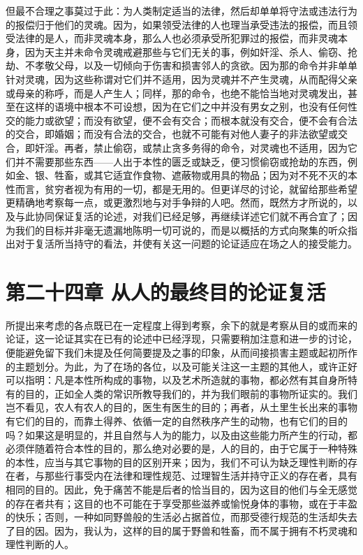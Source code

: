 但最不合理之事莫过于此：为人类制定适当的法律，然后却单单将守法或违法行为的报偿归于他们的灵魂。因为，如果领受法律的人也理当承受违法的报偿，而且领受法律的是人，而非灵魂本身，那么人也必须承受所犯罪过的报偿，而非灵魂本身，因为天主并未命令灵魂戒避那些与它们无关的事，例如奸淫、杀人、偷窃、抢劫、不孝敬父母，以及一切倾向于伤害和损害邻人的贪欲。因为那的命令并非单单针对灵魂，因为这些称谓对它们并不适用，因为灵魂并不产生灵魂，从而配得父亲或母亲的称呼，而是人产生人；同样，那的命令，也绝不能恰当地对灵魂发出，甚至在这样的语境中根本不可设想，因为在它们之中并没有男女之别，也没有任何性交的能力或欲望；而没有欲望，便不会有交合；而根本就没有交合，便不会有合法的交合，即婚姻；而没有合法的交合，也就不可能有对他人妻子的非法欲望或交合，即奸淫。再者，禁止偷窃，或禁止贪多务得的命令，对灵魂也不适用，因为它们并不需要那些东西——人出于本性的匮乏或缺乏，便习惯偷窃或抢劫的东西，例如金、银、牲畜，或其它适宜作食物、遮蔽物或用具的物品；因为对不死不灭的本性而言，贫穷者视为有用的一切，都是无用的。但更详尽的讨论，就留给那些希望更精确地考察每一点，或更激烈地与对手争辩的人吧。然而，既然方才所说的，以及与此协同保证复活的论述，对我们已经足够，再继续详述它们就不再合宜了；因为我们的目标并非毫无遗漏地陈明一切可说的，而是以概括的方式向聚集的听众指出对于复活所当持守的看法，并使有关这一问题的论证适应在场之人的接受能力。\par


\section{第二十四章 从人的最终目的论证复活}

所提出来考虑的各点既已在一定程度上得到考察，余下的就是考察从目的或而来的论证，这一论证其实在已有的论述中已经浮现，只需要稍加注意和进一步的讨论，便能避免留下我们未提及任何简要提及之事的印象，从而间接损害主题或起初所作的主题划分。为此，为了在场的各位，以及可能关注这一主题的其他人，或许正好可以指明：凡是本性所构成的事物，以及艺术所造就的事物，都必然有其自身所特有的目的，正如全人类的常识所教导我们的，并为我们眼前的事物所证实的。我们岂不看见，农人有农人的目的，医生有医生的目的；再者，从土里生长出来的事物有它们的目的，而靠土得养、依循一定的自然秩序产生的动物，也有它们的目的吗？如果这是明显的，并且自然与人为的能力，以及由这些能力所产生的行动，都必须伴随着符合本性的目的，那么绝对必要的是，人的目的，由于它属于一种特殊的本性，应当与其它事物的目的区别开来；因为，我们不可认为缺乏理性判断的存在者，与那些行事受内在法律和理性规范、过理智生活并持守正义的存在者，具有相同的目的。因此，免于痛苦不能是后者的恰当目的，因为这目的他们与全无感觉的存在者共有；这目的也不可能在于享受那些滋养或愉悦身体的事物，或在于丰盈的快乐；否则，一种如同野兽般的生活必占据首位，而那受德行规范的生活却失去了目的因。因为，我认为，这样的目的属于野兽和牲畜，而不属于拥有不朽灵魂和理性判断的人。\par

